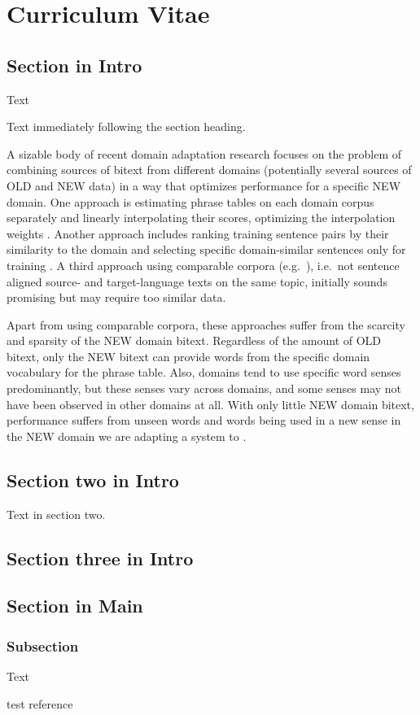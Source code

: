 \documentclass[svgnames,12pt]{report}
\newlength\tablength        \setlength\tablength{20pt}
\newlength\ruledepth        \setlength\ruledepth{2pt}
\newlength\rulelength       \setlength\rulelength{0.95\textwidth}
\newlength\tabheight        \setlength\tabheight{0.25in} \addtolength\tabheight{-\ruledepth}
\newlength\raisetitle       \setlength\raisetitle{1ex}
\newlength\insettitle       \setlength\insettitle{1.5em}
\newlength\afterheadingskip \setlength\afterheadingskip{9ex}
\newcommand\problems{%
  \par\noindent
  \begin{tikzpicture} [remember picture,overlay]
      \node[yshift=0.2em-1em-11pt-11pt,xshift=-2cm] at (0,0) %
      {
      \bfseries\Large\sffamily
      \begin{tikzpicture}[remember picture, overlay]
        \fill[fill=LightSkyBlue] (0,0) rectangle
          (\paperwidth,0.2cm);
        \node[anchor=west,yshift=2ex+0.2cm-1.5pt,xshift=2.5pt,rectangle,
              rounded corners=0pt,inner sep=11pt,
              fill=MidnightBlue]
              {\hspace*{-11pt}\hspace*{-3pt}\hspace*{2cm}\color{white} Something in a rect};
       \end{tikzpicture}
      };

  \end{tikzpicture}%
  \\[\afterheadingskip]
}
\begin{document}
\chapter{Curriculum Vitae}

\section{Section in Intro}
Text


Text immediately following the section heading.

A sizable body of recent domain adaptation research focuses on the problem of combining sources of bitext from different domains (potentially several sources of OLD and NEW data) in a way that optimizes performance for a specific NEW domain.
One approach is estimating phrase tables on each domain corpus separately and linearly interpolating their scores, optimizing the interpolation weights \cite{foster2007mixture}. Another approach includes ranking training sentence pairs by their similarity to the domain and selecting specific domain-similar sentences only for training \cite{axelrod2011domain}. A third approach using comparable corpora (e.g.\ \cite{daume2011domain}), i.e.\ not sentence aligned source- and target-language texts on the same topic, initially sounds promising but may require too similar data.

Apart from using comparable corpora, these approaches suffer from the scarcity and sparsity of the NEW domain bitext. Regardless of the amount of OLD bitext, only the NEW bitext can provide words from the specific domain vocabulary for the phrase table. Also, domains tend to use specific word senses predominantly, but these senses vary across domains, and some senses may not have been observed in other domains at all. %
With only little NEW domain bitext, performance suffers from unseen words and words being used in a new sense in the NEW domain we are adapting a system to \cite{irvine2013measuring}. %

\section{Section two in Intro}
Text in section two.

\section{Section three in Intro}

\newpage
\section{Section in Main}
\subsection{Subsection}
Text
\begin{thebibliography}{99}
 test reference
\end{thebibliography}
\end{document}
